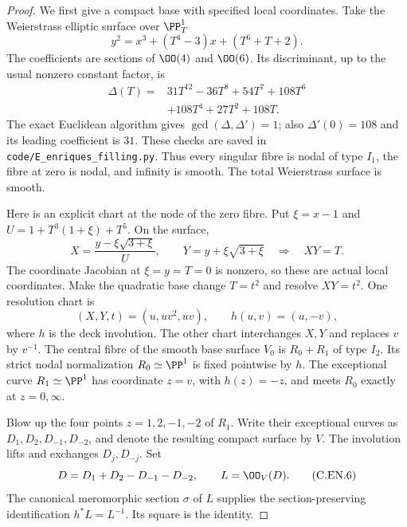 \begin{proof}
We first give a compact base with specified local
coordinates. Take the Weierstrass elliptic surface
over $\PP^1_T$
\[
 y^2=x^3+(T^4-3)x+(T^6+T+2).                       \tag{C.EN.2}\label{cdp:eq:C.EN.2}
\]
The coefficients are sections of $\OO(4)$ and
$\OO(6)$. Its discriminant, up to the usual nonzero
constant factor, is
\[
 \begin{split}
 \Delta(T)={}&31T^{12}-36T^8+54T^7+108T^6\\
             &+108T^4+27T^2+108T .
 \end{split}                                       \tag{C.EN.3}\label{cdp:eq:C.EN.3}
\]
The exact Euclidean algorithm gives
$\gcd(\Delta,\Delta')=1$; also
$\Delta'(0)=108$ and its leading coefficient is
$31$. These checks are saved in
\texttt{code/E\_enriques\_filling.py}.
Thus every singular fibre is nodal of type $I_1$,
the fibre at zero is nodal, and infinity is smooth.
The total Weierstrass surface is smooth.

Here is an explicit chart at the node of the
zero fibre. Put $\xi=x-1$ and
$U=1+T^3(1+\xi)+T^5$. On the surface,
\[
 X=\frac{y-\xi\sqrt{3+\xi}}{U},\qquad
 Y=y+\xi\sqrt{3+\xi}
 \quad\Longrightarrow\quad XY=T .                  \tag{C.EN.4}\label{cdp:eq:C.EN.4}
\]
The coordinate Jacobian at $\xi=y=T=0$ is
nonzero, so these are actual local coordinates.
Make the quadratic base change $T=t^2$ and
resolve $XY=t^2$. One resolution chart is
\[
       (X,Y,t)=(u,uv^2,uv),\qquad
       h(u,v)=(u,-v),                              \tag{C.EN.5}\label{cdp:eq:C.EN.5}
\]
where $h$ is the deck involution. The other chart
interchanges $X,Y$ and replaces $v$ by $v^{-1}$.
The central fibre of the smooth base surface $V_0$
is $R_0+R_1$ of type $I_2$. Its strict nodal
normalization $R_0\simeq\PP^1$ is fixed pointwise
by $h$. The exceptional curve $R_1\simeq\PP^1$
has coordinate $z=v$, with $h(z)=-z$, and
meets $R_0$ exactly at $z=0,\infty$.

Blow up the four points $z=1,2,-1,-2$ of $R_1$.
Write their exceptional curves as
$D_1,D_2,D_{-1},D_{-2}$, and denote the resulting
compact surface by $V$. The involution lifts
and exchanges $D_j,D_{-j}$. Set
\[
 D=D_1+D_2-D_{-1}-D_{-2},\qquad L=\OO_V(D).
                                                               \tag{C.EN.6}\label{cdp:eq:C.EN.6}
\]
The canonical meromorphic section $\sigma$ of
$L$ supplies the section-preserving identification
$h^*L=L^{-1}$. Its square is the identity.


\end{proof}
